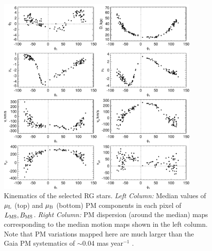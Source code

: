 \documentclass[a4paper,useAMS,usenatbib]{mnras}
\begin{document}
%
\begin{figure}
  \centering
  \includegraphics[width=0.9\textwidth]{orphan_paper_phi1_members.pdf}
  \caption[]{Kinematics of the selected RG stars. {\it Left Column:}
    Median values of $\mu_{\rm L}$ (top) and $\mu_{\rm B}$ (bottom) PM
    components in each pixel of $L_{\rm MS}, B_{\rm MS}$. {\it Right
      Column:} PM dispersion (around the median) maps corresponding to
    the median motion maps shown in the left column. Note that PM
    variations mapped here are much larger than the Gaia PM
    systematics of $\sim$0.04 mas year$^{-1}$ \citep[see][]{Arenou2018}.}
   \label{fig:vel}
\end{figure}
%
\end{document}
